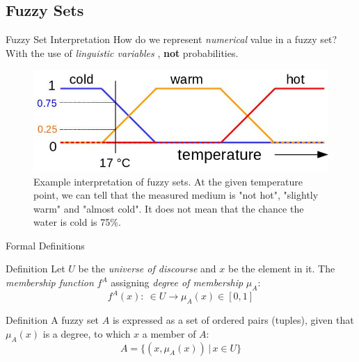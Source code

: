 \documentclass[hyperref={unicode}]{beamer}
\begin{document}
\subsection{Fuzzy Sets}


\begin{frame}{Fuzzy Set Interpretation}
	How do we represent \textit{numerical} value in a fuzzy set? With the use of \textit{linguistic variables} \cite{lieb1993linguistic}, \textbf{not} probabilities.
	\begin{figure}
		\includegraphics[width=.75\textwidth]{fuzzy-set-degrees}
		\caption{Example interpretation of fuzzy sets. At the given temperature point, we can tell that the measured medium is "not hot", "slightly warm" and "almost cold". It does not mean that the chance the water is cold is 75\%.
		\label{fig:fuzzy-set}}
	\end{figure}
\end{frame}

\begin{frame}{Formal Definitions}
	\begin{block}{Definition}
		Let $U$ be the \textit{universe of discourse} and $x$ be the element in it. The \textit{membership function} $f^A$ assigning \textit{degree of membership} $\mu_A$:
		$$f^A(x): \: \in U \rightarrow \mu_A(x) \in [0,1]$$
	\end{block}
	\begin{block}{Definition}
		A fuzzy set $A$ is expressed as a set of ordered pairs (tuples), given that $\mu_A(x)$ is a degree, to which $x$ a member of $A$:
	$$A=\{(x,\mu_A(x))\,|\,x \in U\}$$
	\end{block}
\end{frame}
\end{document}
